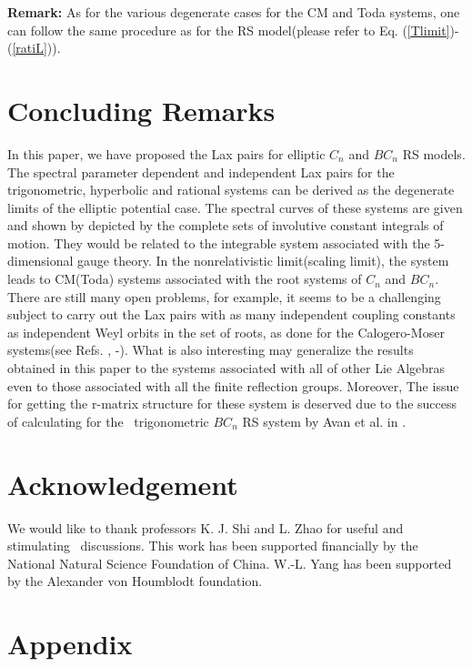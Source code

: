 \documentclass[a4paper,12pt]{article}
\begin{document}
\vspace{0.2truecm}

\textbf{Remark:} As for the various degenerate cases for the CM and Toda
systems, one can follow the same procedure as for the RS
model(please refer to Eq. (\ref{Tlimit})-(\ref{ratiL})).


\section{Concluding Remarks}

\setcounter{equation}{0} \label{summ} In this paper, we have proposed the
Lax pairs for elliptic $C_{n}$ and $BC_{n}$ RS models. The
spectral parameter dependent and independent Lax pairs for
the trigonometric, hyperbolic and rational systems can be
derived as the degenerate limits of the elliptic potential
case. The spectral curves of these systems are given and
shown by depicted by the complete sets of involutive
constant integrals of motion.
They would  be related to the
integrable system associated with  the 5-dimensional gauge
theory\cite{n,bm1}. In the
nonrelativistic limit(scaling limit), the system leads to
CM(Toda) systems associated with the root systems of $C_{n}$
and $BC_{n}$. There are still
many open problems, for example, it seems to be a
challenging subject to carry out the Lax pairs with as many
independent coupling constants as independent Weyl orbits in
the set of roots, as done for the Calogero-Moser systems(see
Refs. \cite{op}, \cite{bcs}
-\cite{hm}). What is also interesting may generalize the results obtained
in this paper to the systems associated with all of other
Lie Algebras even to those associated with all the finite
reflection groups\cite{bcs1}. Moreover, The issue for
getting the r-matrix structure for these system is deserved
due to the success of calculating for the \ trigonometric
$BC_{n}$ RS system by Avan et al. in \cite{Avan}.

\section*{Acknowledgement}

We would like to thank professors K. J. Shi and L. Zhao for
useful and stimulating \ discussions. This work has been
supported financially by the National Natural Science
Foundation of China. W.-L. Yang has been supported by the
Alexander von Houmblodt foundation.

\section*{Appendix}
\end{document}
